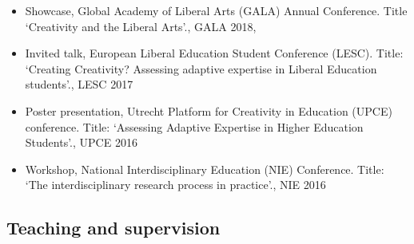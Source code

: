 \documentclass[
  letterpaper,
  DIV=11,
  numbers=noendperiod,
  oneside]{scrartcl}
\providecommand{\tightlist}{%
  \setlength{\itemsep}{0pt}\setlength{\parskip}{0pt}}\usepackage{longtable,booktabs,array}
\begin{document}
{}

\begin{itemize}
\tightlist
\item
  Showcase, Global Academy of Liberal Arts (GALA) Annual Conference.
  Title `Creativity and the Liberal Arts'., GALA 2018,
\end{itemize}

{}

\begin{itemize}
\tightlist
\item
  Invited talk, European Liberal Education Student Conference (LESC).
  Title: `Creating Creativity? Assessing adaptive expertise in Liberal
  Education students'., LESC 2017
\end{itemize}

{}

\begin{itemize}
\tightlist
\item
  Poster presentation, Utrecht Platform for Creativity in Education
  (UPCE) conference. Title: `Assessing Adaptive Expertise in Higher
  Education Students'., UPCE 2016
\end{itemize}

{}

\begin{itemize}
\tightlist
\item
  Workshop, National Interdisciplinary Education (NIE) Conference.
  Title: `The interdisciplinary research process in practice'., NIE 2016
\end{itemize}

\hypertarget{teaching-and-supervision}{%
\subsection{Teaching and supervision}\label{teaching-and-supervision}}
\end{document}
